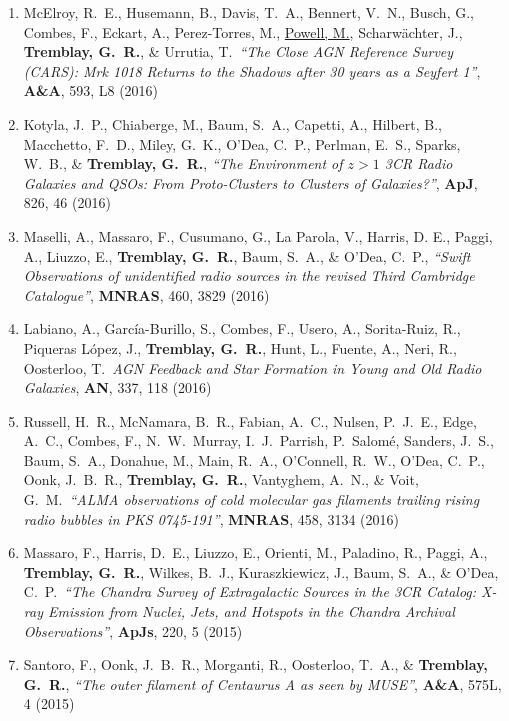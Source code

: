 \documentclass[11pt]{article}
\begin{document}
\begin{enumerate}[resume]
\item McElroy, R.~E., Husemann, B.,
Davis, T.~A., Bennert, V.~N., Busch, G.,
Combes, F., Eckart, A., Perez-Torres,
M., \uline{Powell, M.}, Scharw\"{a}chter, J., \textbf{Tremblay, G.~R.}, \& Urrutia, T.\ \textit{``The Close AGN Reference Survey (CARS): Mrk 1018 Returns to the Shadows after 30 years as a Seyfert 1''}, \textbf{A\&A}, 593, L8 (2016)


\item Kotyla, J.~P., Chiaberge, M., Baum, S.~A., Capetti, A., Hilbert, B., Macchetto, F.~D., Miley, G.~K., O'Dea, C.~P., Perlman, E.~S., Sparks, W.~B., \& \textbf{Tremblay, G.~R.}, \textit{``The Environment of $z>1$ 3CR Radio Galaxies and QSOs: From Proto-Clusters to Clusters of Galaxies?''}, \textbf{ApJ}, 826, 46 (2016)


\item Maselli, A., Massaro, F., Cusumano, G., La Parola, V., Harris, D. E., Paggi, A., Liuzzo, E., \textbf{Tremblay, G.~R.},
Baum, S.~A., \& O'Dea, C.~P., \textit{``Swift Observations of unidentified radio sources in the revised Third Cambridge Catalogue''}, \textbf{MNRAS}, 460, 3829 (2016)

\item Labiano, A., Garc\'{i}a-Burillo, S., Combes, F., Usero, A., Sorita-Ruiz, R., Piqueras L\'{o}pez, J., \textbf{Tremblay, G.~R.}, Hunt, L., Fuente, A., Neri, R.,
Oosterloo, T.\ \textit{AGN Feedback and Star Formation in Young and Old Radio Galaxies}, \textbf{AN}, 337, 118 (2016)

\item Russell, H.~R., McNamara, B.~R., Fabian, A.~C., Nulsen, P.~J.~E., Edge, A.~C., Combes, F., N.~W.~Murray, I.~J.~Parrish, P.~Salom\'{e}, Sanders, J.~S., Baum, S.~A., Donahue, M., Main, R.~A.,
O'Connell, R.~W., O'Dea, C.~P., Oonk, J.~B.~R., \textbf{Tremblay, G.~R.}, Vantyghem, A.~N., \& Voit, G.~M.\ \textit{``ALMA observations of cold molecular gas filaments trailing rising radio bubbles in PKS 0745-191''}, \textbf{MNRAS}, 458, 3134 (2016)


\item Massaro, F., Harris, D.~E., Liuzzo, E., Orienti, M., Paladino, R., Paggi, A., \textbf{Tremblay, G.~R.}, Wilkes, B.~J., Kuraszkiewicz, J., Baum, S.~A., \& O'Dea, C.~P.\ \textit{``The Chandra Survey of Extragalactic Sources in the 3CR Catalog: X-ray Emission from Nuclei, Jets, and Hotspots in the Chandra Archival Observations''}, \textbf{ApJs}, 220, 5 (2015)


\item Santoro, F., Oonk, J.~B.~R., Morganti, R., Oosterloo, T.~A., \& \textbf{Tremblay, G.~R.},  \textit{``The outer filament of Centaurus A as seen by MUSE''}, \textbf{A\&A}, 575L, 4 (2015)



\end{enumerate}
\end{document}
